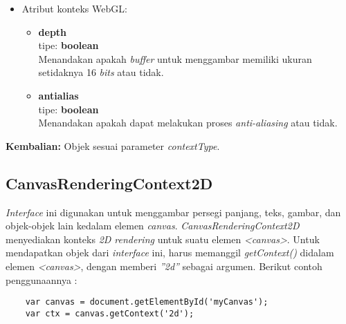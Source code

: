 \begin{itemize}
\begin{itemize}
\begin{itemize}
			\item Atribut konteks WebGL:
			\begin{itemize}
				\item \textbf{depth} \\ tipe: \textbf{boolean} \\ Menandakan apakah \textit{buffer} untuk menggambar memiliki ukuran setidaknya 16 \textit{bits} atau tidak.
				\item \textbf{antialias} \\tipe: \textbf{boolean} \\ Menandakan apakah dapat melakukan proses \textit{anti-aliasing} atau tidak.
			\end{itemize}
		\end{itemize}
	\end{itemize}
	\textbf{Kembalian:} Objek sesuai parameter \textit{contextType}.
	
\end{itemize}


\subsection{CanvasRenderingContext2D}
\textit{Interface} ini digunakan untuk menggambar persegi panjang, teks, gambar, dan objek-objek lain kedalam elemen \textit{canvas}. \textit{CanvasRenderingContext2D} menyediakan konteks \textit{2D rendering} untuk suatu elemen \textit{<canvas>}.
Untuk mendapatkan objek dari \textit{interface} ini, harus memanggil \textit{getContext()} didalam elemen \textit{<canvas>}, dengan memberi \textit{''2d''} sebagai argumen. Berikut contoh penggunaannya :

\begin{lstlisting}
	var canvas = document.getElementById('myCanvas');
	var ctx = canvas.getContext('2d');
\end{lstlisting}


